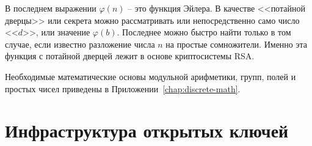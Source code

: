 В последнем выражении $\varphi \left( n \right)$ -- это функция Эйлера. В качестве <<потайной дверцы>> или секрета можно рассматривать или непосредственно само число <<$d$>>, или значение $\varphi \left( b \right)$. Последнее можно быстро найти только в том случае, если известно разложение числа $n$ на простые сомножители. Именно эта функция с потайной дверцей лежит в основе криптосистемы RSA.

Необходимые математические основы модульной арифметики, групп, полей и простых чисел приведены в Приложении~\ref{chap:discrete-math}.









\section{Инфраструктура открытых ключей}\label{chapter-public-key-infrastructure}




